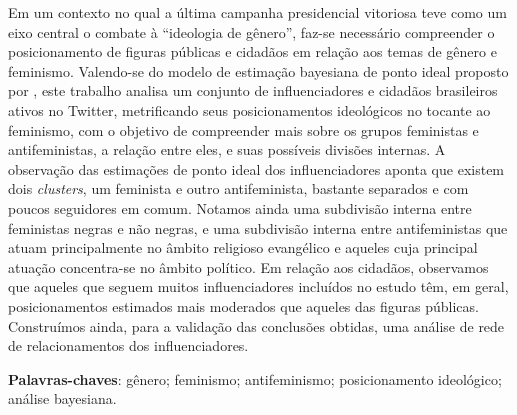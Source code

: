 \documentclass[
	12pt,				%
	openright,			%
	twoside,			%
	a4paper,			%
	english,			%
	brazil				%
	]{abntex2}
\begin{document}

\setlength{\absparsep}{18pt} %
\begin{resumo}
 Em um contexto no qual a última campanha presidencial vitoriosa teve como um eixo central o combate à “ideologia de gênero”, faz-se necessário compreender o posicionamento de figuras públicas e cidadãos em relação aos temas de gênero e feminismo. Valendo-se do modelo de estimação bayesiana de ponto ideal proposto por , este trabalho analisa um conjunto de influenciadores e cidadãos brasileiros ativos no Twitter, metrificando seus posicionamentos ideológicos no tocante ao feminismo, com o objetivo de compreender mais sobre os grupos feministas e antifeministas, a relação entre eles, e suas possíveis divisões internas. A observação das estimações de ponto ideal dos influenciadores aponta que existem dois \textit{clusters}, um feminista e outro antifeminista, bastante separados e com poucos seguidores em comum. Notamos ainda uma subdivisão interna entre feministas negras e não negras, e uma subdivisão interna entre antifeministas que atuam principalmente no âmbito religioso evangélico e aqueles cuja principal atuação concentra-se no âmbito político. Em relação aos cidadãos, observamos que aqueles que seguem muitos influenciadores incluídos no estudo têm, em geral, posicionamentos estimados mais moderados que aqueles das figuras públicas. Construímos ainda, para a validação das conclusões obtidas, uma análise de rede de relacionamentos dos influenciadores.

\textbf{Palavras-chaves}: gênero; feminismo; antifeminismo; posicionamento ideológico; análise bayesiana.
\end{resumo}

%
% 


\end{document}
